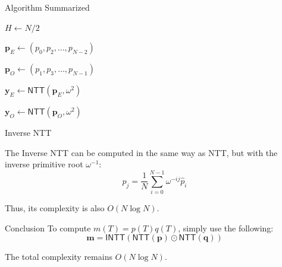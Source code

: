 \documentclass{zkdl-presentation-template}
\begin{document}
    \begin{frame}{Algorithm Summarized}
        \begin{algorithm}[H]
            \caption{Number Theoretic Transform (NTT)}


            $H \gets N/2$ 

            $\mathbf{p}_{E} \gets (p_0,p_2,\dots,p_{N-2})$ 

            $\mathbf{p}_{O} \gets (p_1,p_3,\dots,p_{N-1})$ 

            $\mathbf{y}_E \gets \mathsf{NTT}(\mathbf{p}_{E}, \omega^2)$ 

            $\mathbf{y}_O \gets \mathsf{NTT}(\mathbf{p}_O, \omega^2)$ 

        \end{algorithm}
    \end{frame}

    \begin{frame}{Inverse NTT}
        \begin{theorem}
            The Inverse NTT can be computed in the same way as NTT, but with the
            inverse primitive root $\omega^{-1}$:
            \begin{equation*}
                p_j = \frac{1}{N}\sum_{i=0}^{N-1}\omega^{-ij}\hat{p}_i
            \end{equation*}

            Thus, its complexity is also $O(N \log N)$.
        \end{theorem}
        \pause

        \begin{remarkblock}{Conclusion}
            To compute $m(T) = p(T)q(T)$, simply use the following:
            \begin{equation*}
                \mathbf{m} = \mathsf{INTT}(\mathsf{NTT}(\mathbf{p}) \odot \mathsf{NTT}(\mathbf{q}))
            \end{equation*}

            The total complexity remains $O(N \log N)$.
        \end{remarkblock}
    \end{frame}

    \makeclosingframe
\end{document}
